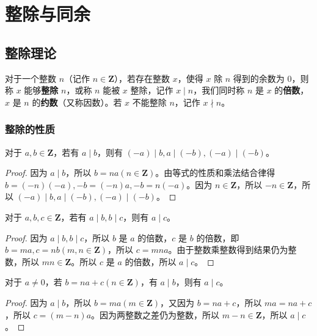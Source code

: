 \chapter{整除与同余}

\section{整除理论}

对于一个整数 $n$（记作 $n \in \mathbf{Z}$），若存在整数 $x$，使得 $x$ 除 $n$ 得到的余数为 $0$，则称 $x$ 能够\textbf{整除} $n$，或称 $n$ 能被 $x$ 整除，记作 $x \mid n$，我们同时称 $n$ 是 $x$ 的\textbf{倍数}，$x$ 是 $n$ 的\textbf{约数}（又称因数）。若 $x$ 不能整除 $n$，记作 $x \nmid n$。

\subsection{整除的性质}

\begin{theorem}
对于 $a,b \in \mathbf{Z}$，若有 $a \mid b$，则有 $(-a) \mid b, a \mid (-b), (-a) \mid (-b)$。
\end{theorem}

\begin{proof}
因为 $a \mid b$，所以 $b = na (n \in \mathbf{Z})$。由等式的性质和乘法结合律得 $b = (-n)(-a), -b = (-n)a, -b=n(-a)$。因为 $n \in \mathbf{Z}$，所以 $-n \in \mathbf{Z}$，所以 $(-a) \mid b, a \mid (-b), (-a) \mid (-b)$。
\end{proof}

\begin{theorem}
对于 $a,b,c \in \mathbf{Z}$，若有 $a \mid b, b \mid c$，则有 $a \mid c$。
\end{theorem}

\begin{proof}
因为 $a \mid b, b \mid c$，所以 $b$ 是 $a$ 的倍数，$c$ 是 $b$ 的倍数，即 $b = ma, c = nb (m, n \in \mathbf{Z})$，所以 $c = mna$。由于整数乘整数得到结果仍为整数，所以 $mn \in \mathbf{Z}$。所以 $c$ 是 $a$ 的倍数，所以 $a \mid c$。
\end{proof}

\begin{theorem}
对于 $a \neq 0$，若 $b=na+c(n \in \mathbf{Z})$，有 $a \mid b$，则有 $a \mid c$。
\end{theorem}

\begin{proof}
因为 $a \mid b$，所以 $b = ma(m \in \mathbf{Z})$，又因为 $b=na+c$，所以 $ma = na + c$，所以 $c = (m-n)a$。因为两整数之差仍为整数，所以 $m-n \in \mathbf{Z}$，所以 $a \mid c$。
\end{proof}

